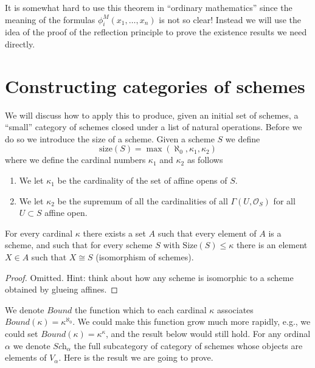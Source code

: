 \medskip\noindent
It is somewhat hard to use this theorem in ``ordinary mathematics''
since the meaning of the formulas $\phi_i^M(x_1, \ldots, x_n)$
is not so clear! Instead we will use the idea of the proof of the
reflection principle to prove the existence results we need directly.

\section{Constructing categories of schemes}
\label{section-categories-schemes}

\noindent
We will discuss how to apply this to produce, given an initial
set of schemes, a ``small'' category of schemes closed under
a list of natural operations. Before we do so we introduce the
size of a scheme. Given a scheme $S$ we define
$$
\text{size}(S) = \max(\aleph_0, \kappa_1, \kappa_2)
$$
where we define the cardinal numbers $\kappa_1$ and $\kappa_2$ as follows
\begin{enumerate}
\item We let $\kappa_1$ be the cardinality of the set of affine opens of $S$.
\item We let $\kappa_2$ be the supremum of all the cardinalities of
all $\Gamma(U, \mathcal{O}_S)$ for all $U \subset S$ affine open.
\end{enumerate}

\begin{lemma}
\label{lemma-bounded-size}
For every cardinal $\kappa$ there exists a set $A$ such
that every element of $A$ is a scheme, and such that for every
scheme $S$ with $\text{Size}(S) \leq \kappa$ there is
an element $X \in A$ such that $X \cong S$ (isomorphism
of schemes).
\end{lemma}

\begin{proof}
Omitted. Hint: think about how any scheme is isomorphic to a scheme
obtained by glueing affines.
\end{proof}

\noindent
We denote $Bound$ the function which to each
cardinal $\kappa$ associates $Bound(\kappa) = \kappa^{\aleph_0}$.
We could make this function grow much more rapidly, e.g., we could
set $Bound(\kappa) = \kappa^\kappa$, and the result below would still hold.
For any ordinal $\alpha$ we denote $\textit{Sch}_\alpha$ the full
subcategory of category of schemes whose objects are elements of
$V_\alpha$. Here is the result we are going to prove.

